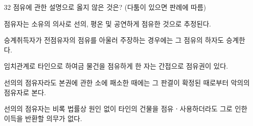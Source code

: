 \begin{question}{32}
점유에 관한 설명으로 옳지 않은 것은? (다툼이 있으면 판례에 따름)
\begin{choices}
  \item 점유자는 소유의 의사로 선의, 평온 및 공연하게 점유한 것으로 추정된다.
  \item 승계취득자가 전점유자의 점유를 아울러 주장하는 경우에는 그 점유의 하자도 승계한다.
  \item 임치관계로 타인으로 하여금 물건을 점유하게 한 자는 간접으로 점유권이 있다.
  \item 선의의 점유자라도 본권에 관한 소에 패소한 때에는 그 판결이 확정된 때로부터 악의의 점유자로 본다.
  \item 선의의 점유자는 비록 법률상 원인 없이 타인의 건물을 점유ㆍ사용하더라도 그로 인한 이득을 반환할 의무가 없다.
\end{choices}
\end{question}
